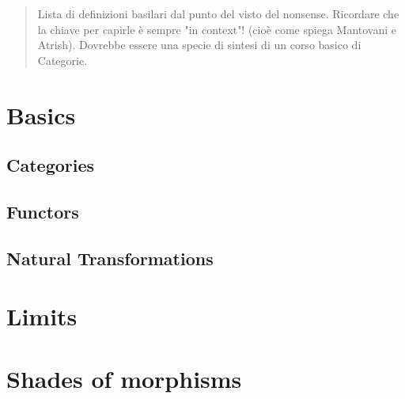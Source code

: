 \documentclass[a4paper,12pt,fleqn]{scrartcl}  %
\begin{document}
 

\begin{abstract}
	Lista di definizioni basilari dal punto del visto del nonsense.
	Ricordare che la chiave per capirle è sempre "in context"! (cioè come spiega Mantovani e Atrish).
	Dovrebbe essere una specie di sintesi di un corso basico di Categorie.
\end{abstract}

\section{Basics}
	\subsection{Categories}
	 

	\newpage	
	\subsection{Functors}
	
	
	
	

	\newpage
	\subsection{Natural Transformations}
	
	

% 
\newpage
\section{Limits}
	
	

% 
\newpage
\section{Shades of morphisms}
	
\end{document}
